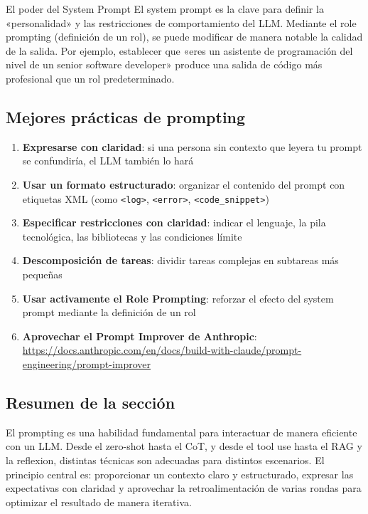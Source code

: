 \documentclass[a4paper]{article}
\begin{document}
\begin{knowledgebox}{El poder del System Prompt}
El system prompt es la clave para definir la «personalidad» y las restricciones de comportamiento del LLM. Mediante el role prompting (definición de un rol), se puede modificar de manera notable la calidad de la salida. Por ejemplo, establecer que «eres un asistente de programación del nivel de un senior software developer» produce una salida de código más profesional que un rol predeterminado.
\end{knowledgebox}

\subsection{Mejores prácticas de prompting}

\begin{enumerate}
    \item \textbf{Expresarse con claridad}: si una persona sin contexto que leyera tu prompt se confundiría, el LLM también lo hará
    \item \textbf{Usar un formato estructurado}: organizar el contenido del prompt con etiquetas XML (como \texttt{<log>}, \texttt{<error>}, \texttt{<code\_snippet>})
    \item \textbf{Especificar restricciones con claridad}: indicar el lenguaje, la pila tecnológica, las bibliotecas y las condiciones límite
    \item \textbf{Descomposición de tareas}: dividir tareas complejas en subtareas más pequeñas
    \item \textbf{Usar activamente el Role Prompting}: reforzar el efecto del system prompt mediante la definición de un rol
    \item \textbf{Aprovechar el Prompt Improver de Anthropic}: \url{https://docs.anthropic.com/en/docs/build-with-claude/prompt-engineering/prompt-improver}
\end{enumerate}

\subsection{Resumen de la sección}

El prompting es una habilidad fundamental para interactuar de manera eficiente con un LLM. Desde el zero-shot hasta el CoT, y desde el tool use hasta el RAG y la reflexion, distintas técnicas son adecuadas para distintos escenarios. El principio central es: proporcionar un contexto claro y estructurado, expresar las expectativas con claridad y aprovechar la retroalimentación de varias rondas para optimizar el resultado de manera iterativa.
\end{document}
